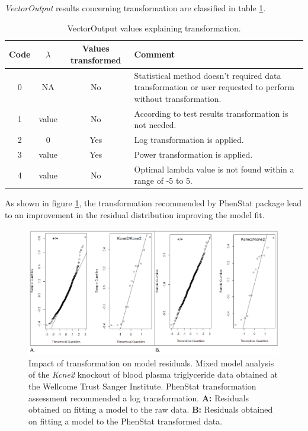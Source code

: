 \documentclass[12pt,a4paper]{article}
\begin{document}
\textit{VectorOutput} results concerning transformation are classified in table \ref{table:tr2}.
\begin{table}[!h]
\begin{center}
\begin{tabular}{| c | c | c | p{8cm} |}
\hline
Code&$\lambda$&Values transformed&Comment\\\hline
0&NA&No&Statistical method doesn't required data transformation or user requested to perform without transformation.\\
1&value&No&According to test results transformation is not needed.\\
2&0&Yes&Log transformation is applied.\\
3&value&Yes&Power transformation is applied.\\
4&value&No&Optimal lambda value is not found within a range of -5 to 5.\\
\hline
\end{tabular}
\caption{VectorOutput values explaining transformation.}\label{table:tr2}
\end{center}
\end{table}

As shown in figure \ref{fig:tr1}, the transformation recommended by PhenStat package lead to an improvement in the residual distribution improving the model fit.  

\begin{figure}[!htpb]%
\centerline{\includegraphics[scale=0.5]{transformation_example.png}}
\caption{Impact of transformation on model residuals. Mixed model analysis of the \textit{Kcne2} knockout of blood plasma triglyceride data obtained at the Wellcome Trust Sanger Institute. PhenStat transformation assessment recommended a log transformation. \textbf{A:}  Residuals obtained on fitting a model to the raw data.  \textbf{B:}  Residuals obtained on fitting a model to the PhenStat transformed data. }\label{fig:tr1}
\end{figure}
\end{document}
